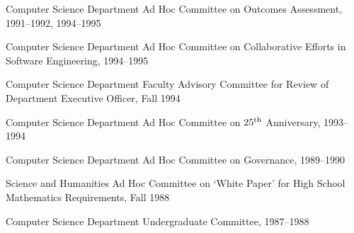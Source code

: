 \hangindent=0.3in
Computer Science Department Ad Hoc Committee on Outcomes Assessment,
1991--1992, 1994--1995

\hangindent=0.3in
Computer Science Department Ad Hoc Committee on Collaborative
Efforts in Software Engineering, 1994--1995

\hangindent=0.3in
Computer Science Department Faculty Advisory Committee for
Review of Department Executive Officer, Fall 1994

\hangindent=0.3in
Computer Science Department Ad Hoc Committee on $25^{\rm th}$ Anniversary,
1993--1994

\hangindent=0.3in
Computer Science Department Ad Hoc Committee on Governance, 1989--1990

\hangindent=0.3in
Science and Humanities Ad Hoc Committee on `White Paper' for High
School Mathematics Requirements, Fall 1988

\hangindent=0.3in
Computer Science Department Undergraduate Committee, 1987--1988





